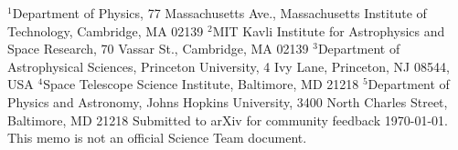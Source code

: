 {\tiny\noindent
$^1$Department of Physics, 77 Massachusetts Ave., Massachusetts 
Institute of Technology, Cambridge, MA 02139\newline
\noindent$^2$MIT Kavli Institute for Astrophysics and Space Research, 70 Vassar
St., Cambridge, MA 02139\newline
\noindent$^3$Department of Astrophysical Sciences, Princeton University, 4 Ivy 
Lane, Princeton, NJ 08544, USA\newline	
\noindent$^4$Space Telescope Science Institute, Baltimore, MD 21218\newline
\vspace{0cm} \noindent$^5$Department of Physics and Astronomy, Johns 
Hopkins 
University, 3400 North Charles Street, Baltimore, MD 21218 \newline
\noindent\vspace{-0.222cm}Submitted to arXiv for community feedback \today.
This memo is not an official \tess Science Team document.}
\vspace{-0.1cm}